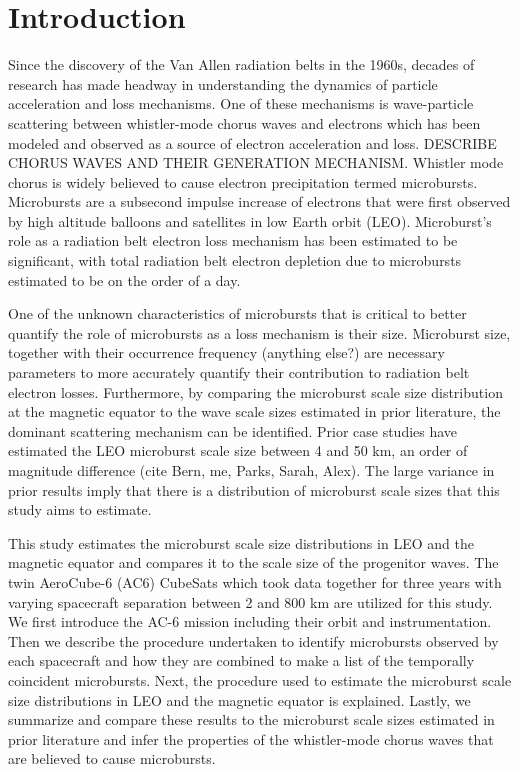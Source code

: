 \documentclass[draft]{agujournal2019}
\begin{document}
\section{Introduction}
Since the discovery of the Van Allen radiation belts in the 1960s, decades of research has made headway in understanding the dynamics of particle acceleration and loss mechanisms. One of these mechanisms is wave-particle scattering between whistler-mode chorus waves and electrons which has been modeled and observed as a source of electron acceleration and loss. DESCRIBE CHORUS WAVES AND THEIR GENERATION MECHANISM. Whistler mode chorus is widely believed to cause electron precipitation termed microbursts. Microbursts are a subsecond impulse increase of electrons that were first observed by high altitude balloons and satellites in low Earth orbit (LEO). Microburst’s role as a radiation belt electron loss mechanism has been estimated to be significant, with total radiation belt electron depletion due to microbursts estimated to be on the order of a day. 

One of the unknown characteristics of microbursts that is critical to better quantify the role of microbursts as a loss mechanism is their size. Microburst size, together with their occurrence frequency (anything else?) are necessary parameters to more accurately quantify their contribution to radiation belt electron losses. Furthermore, by comparing the microburst scale size distribution at the magnetic equator to the wave scale sizes estimated in prior literature, the dominant scattering mechanism can be identified. Prior case studies have estimated the LEO microburst scale size between 4 and 50 km, an order of magnitude difference (cite Bern, me, Parks, Sarah, Alex). The large variance in prior results imply that there is a distribution of microburst scale sizes that this study aims to estimate.

This study estimates the microburst scale size distributions in LEO and the magnetic equator and compares it to the scale size of the progenitor waves. The twin AeroCube-6 (AC6) CubeSats which took data together for three years with varying spacecraft separation between 2 and 800 km are utilized for this study. We first introduce the AC-6 mission including their orbit and instrumentation. Then we describe the procedure undertaken to identify microbursts observed by each spacecraft and how they are combined to make a list of the temporally coincident microbursts. Next, the procedure used to estimate the microburst scale size distributions in LEO and the magnetic equator is explained. Lastly, we summarize and compare these results to the microburst scale sizes estimated in prior literature and infer the properties of the whistler-mode chorus waves that are believed to cause microbursts.
\end{document}
